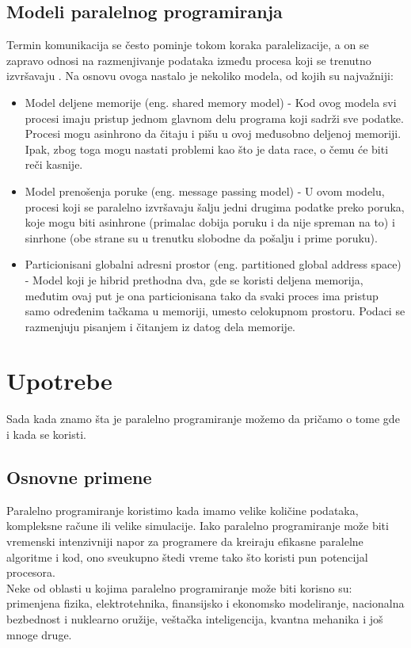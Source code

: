 \documentclass[a4paper]{article}
\begin{document}
{\subsection{Modeli paralelnog programiranja}
Termin komunikacija se često pominje tokom koraka paralelizacije, a on se zapravo odnosi na razmenjivanje podataka između procesa koji se trenutno izvršavaju \cite{models}. Na osnovu ovoga nastalo je nekoliko modela, od kojih su najvažniji: \\
\begin{itemize}
\item Model deljene memorije (eng. shared memory model) - Kod ovog modela svi procesi imaju pristup jednom glavnom delu programa koji sadrži sve podatke. Procesi mogu asinhrono da čitaju i pišu u ovoj međusobno deljenoj memoriji. Ipak, zbog toga mogu nastati problemi kao što je data race, o čemu će biti reči kasnije.
\item Model prenošenja poruke (eng. message passing model) - U ovom modelu, procesi koji se paralelno izvršavaju šalju jedni drugima podatke preko poruka, koje mogu biti asinhrone (primalac dobija poruku i da nije spreman na to) i sinrhone (obe strane su u trenutku slobodne da pošalju i prime poruku).
\item Particionisani globalni adresni prostor (eng. partitioned global address space) - Model koji je hibrid prethodna dva, gde se koristi deljena memorija, međutim ovaj put je ona particionisana tako da svaki proces ima pristup samo određenim tačkama u memoriji, umesto celokupnom prostoru. Podaci se razmenjuju pisanjem i čitanjem iz datog dela memorije.
\end{itemize}
	
	\section{Upotrebe}
Sada kada znamo šta je paralelno programiranje možemo da pričamo o tome gde i kada se koristi.
\subsection{Osnovne primene}

Paralelno programiranje koristimo kada imamo velike količine podataka, kompleksne račune ili velike simulacije. Iako paralelno programiranje može biti vremenski intenzivniji napor za programere da kreiraju efikasne paralelne algoritme i kod, ono sveukupno štedi vreme tako što koristi pun potencijal procesora.\\Neke od oblasti u kojima paralelno programiranje može biti korisno su: primenjena fizika, elektrotehnika, finansijsko i ekonomsko modeliranje,  nacionalna bezbednost i nuklearno oružije, veštačka inteligencija, kvantna mehanika\cite{totalview} i još mnoge druge.

}
\end{document}
